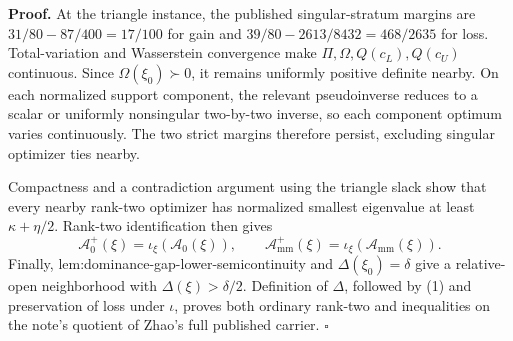 \textbf{Proof.}
At the triangle instance, the published singular-stratum margins are \(31/80-87/400=17/100\) for gain and \(39/80-2613/8432=468/2635\) for loss.  Total-variation and Wasserstein convergence make \(\Pi,\Omega,Q(c_L),Q(c_U)\) continuous.  Since \(\Omega(\xi_0)\succ0\), it remains uniformly positive definite nearby.  On each normalized support component, the relevant pseudoinverse reduces to a scalar or uniformly nonsingular two-by-two inverse, so each component optimum varies continuously.  The two strict margins therefore persist, excluding singular optimizer ties nearby.

Compactness and a contradiction argument using the triangle slack show that every nearby rank-two optimizer has normalized smallest eigenvalue at least \(\kappa+\eta/2\).  Rank-two identification then gives
\[
\mathcal A_0^+(\xi)=\iota_\xi(\mathcal A_0(\xi)),
\qquad
\mathcal A_{\mathrm{mm}}^+(\xi)=\iota_\xi(\mathcal A_{\mathrm{mm}}(\xi)).
\tag{1}
\]
Finally, lem:dominance-gap-lower-semicontinuity and \(\Delta(\xi_0)=\delta\) give a relative-open neighborhood with \(\Delta(\xi)>\delta/2\).  Definition of \(\Delta\), followed by (1) and preservation of loss under \(\iota\), proves both ordinary rank-two and inequalities on the note's quotient of Zhao's full published carrier. \(\square\)